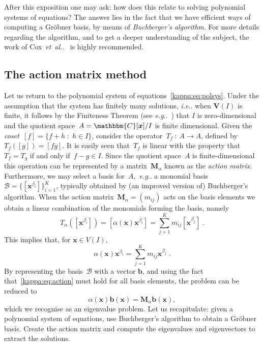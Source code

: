 \documentclass[11pt,a4paper]{article}
\makeatletter
\theoremstyle{definition}
\newcommand{\mat}[1]{\bm{#1}}
\newcommand{\C}{\ensuremath{\mathbbm{C}}}
\DeclareRobustCommand\eg{\emph{e.g}\@ifnextchar.{}{.\@}}
\DeclareRobustCommand\etal{\emph{et~al}\@ifnextchar.{}{.\@}}
\DeclareRobustCommand\ie{\emph{i.e}\@ifnextchar.{}{.\@}}
\makeatother
\begin{document}
After this exposition one may ask: how does this relate to solving polynomial systems
of equations? The answer lies in the fact that we have efficient ways of computing
a Gröbner basis, by means of \emph{Buchberger's algorithm}.
For more details regarding the algorithm, and to get a deeper understanding of the subject,
the work of Cox~\etal{}~\cite{cox,cox2} is highly recommended.

\subsection{The action matrix method}\label{kappa:sec:actionmatrix}
Let us return to the polynomial system of equations~\eqref{kappa:eq:polsys}. Under the
assumption that the system has finitely many solutions, \ie{} when $\mat{V}(I)$ is finite,
it follows by the Finiteness Theorem (see \eg{}~\cite{cox2}) that $I$ is
zero-dimensional and the quotient space~\mbox{$A=\C[\mat{x}]/I$} is
finite dimensional. Given the \emph{coset}~$[f] = \{f+h\;:\;h\in I\}$,
consider the operator~\mbox{$T_f\::\:A\longrightarrow A$}, defined by~$T_f([g])=[fg]$.
It is easily seen that~$T_f$ is
linear with the property that~$T_f=T_g$ if and only if~$f-g\in I$.
Since the quotient space~$A$ is finite-dimensional this operation can be
represented by a matrix~$\mat{M}_\alpha$ known as the \emph{action matrix}.
Furthermore, we may select a basis for~$A$,~\eg{} a monomial
basis~$\mathcal{B}=\{[\mat{x}^{\beta_i}]\}_{i=1}^K$,
typically obtained by (an improved version of)
Buchberger's algorithm.
When the action matrix~$\mat{M}_\alpha=(m_{ij})$ acts on the basis elements we obtain a
linear combination of the monomials forming the basis, namely
\begin{equation}
    T_\alpha([\mat{x}^{\beta_i}]) = [\alpha(\mat{x})\mat{x}^{\beta_i}] = \sum_{j=1}^Km_{ij}[\mat{x}^{\beta_j}]\;.
\end{equation}
This implies that,
for $\mat{x}\in V(I)$,
\begin{equation}\label{kappa:eq:action}
    \alpha(\mat{x})\mat{x}^{\beta_i}=\sum_{j=1}^Km_{ij}\mat{x}^{\beta_j}\;.
\end{equation}
By representing the basis~$\mathcal{B}$ with a vector $\mat{b}$, and using the fact
that~\eqref{kappa:eq:action} must hold for all basis elements, the problem can be reduced to
\begin{equation}\label{eq:actionmat}
    \alpha(\mat{x})\mat{b}(\mat{x}) = \mat{M}_\alpha\mat{b}(\mat{x}),
\end{equation}
which we recognise as an eigenvalue problem.
Let us recapitulate: given a polynomial
system of equations, use Buchberger's algorithm to obtain a Gröbner basis. Create the
action matrix and compute the eigenvalues and eigenvectors to extract the solutions.
\end{document}
